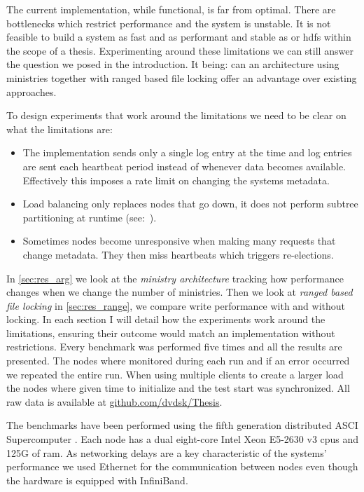 The current implementation, while functional, is far from optimal. There are bottlenecks which restrict performance and the system is unstable. It is not feasible to build a system as fast and as performant and stable as \ceph{} or \ac{hdfs} within the scope of a thesis. Experimenting around these limitations we can still answer the question we posed in the introduction. It being: can an architecture using ministries together with ranged based file locking offer an advantage over existing approaches.

To design experiments that work around the limitations we need to be clear on what the limitations are:

\begin{itemize}
	\item The \raft{} implementation sends only a single log entry at the time and log entries are sent each heartbeat period instead of whenever data becomes available. Effectively this imposes a rate limit on changing the systems metadata.
	\item Load balancing only replaces nodes that go down, it does not perform subtree partitioning at runtime (see:~).
	\item Sometimes nodes become unresponsive when making many requests that change metadata. They then miss heartbeats which triggers re-elections.
\end{itemize}

In \cref{sec:res_arg} we look at the \textit{ministry architecture} tracking how performance changes when we change the number of ministries. Then we look at \textit{ranged based file locking} in \cref{sec:res_range}, we compare write performance with and without locking. In each section I will detail how the experiments work around the limitations, ensuring their outcome would match an implementation without restrictions. Every benchmark was performed five times and all the results are presented. The nodes where monitored during each run and if an error occurred we repeated the entire run. When using multiple clients to create a larger load the nodes where given time to initialize and the test start was synchronized. All raw data is available at \href{https://github.com/dvdsk/Thesis}{github.com/dvdsk/Thesis}.

The benchmarks have been performed using the fifth generation distributed ASCI Supercomputer \cite{das5}. Each node has a dual eight-core Intel Xeon E5-2630 v3 cpus and 125G of ram. As networking delays are a key characteristic of the systems' performance we used Ethernet for the communication between nodes even though the hardware is equipped with InfiniBand.

